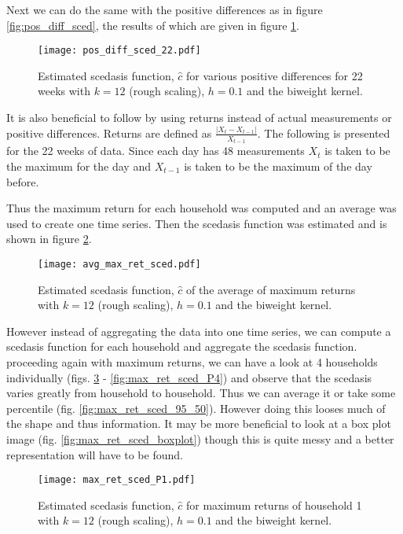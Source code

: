 \documentclass[a4paper]{article}
\begin{document}
Next we can do the same with the positive differences as in figure \ref{fig:pos_diff_sced}, the results of which are given in figure \ref{fig:pos_diff_sced_22}.

\begin{figure}
\centering
\texttt{[image: pos\_diff\_sced\_22.pdf]}
\caption{\label{fig:pos_diff_sced_22} Estimated scedasis function, $\hat{c}$ for various positive differences for 22 weeks with $k=12$ (rough scaling), $h=0.1$ and the biweight kernel.}
\end{figure}

It is also beneficial to follow \cite{einmahl16} by using returns instead of actual measurements or positive differences. Returns are defined as $\frac{\left|X_t - X_{t-1}\right|}{X_{t-1}}$.  The following is presented for the 22 weeks of data. Since each day has 48 measurements $X_t$ is taken to be the maximum for the day and $X_{t-1}$ is taken to be the maximum of the day before.

Thus the maximum return for each household was computed and an average was used to create one time series. Then the scedasis function was estimated and is shown in figure \ref{fig:avg_max_ret_sced}.

\begin{figure}
\centering
\texttt{[image: avg\_max\_ret\_sced.pdf]}
\caption{\label{fig:avg_max_ret_sced} Estimated scedasis function, $\hat{c}$ of the average of maximum returns with $k=12$ (rough scaling), $h=0.1$ and the biweight kernel.}
\end{figure}


However instead of aggregating the data into one time series, we can compute a scedasis function for each household and aggregate the scedasis function. proceeding again with maximum returns, we can have a look at 4 households individually (figs. \ref{fig:max_ret_sced_P1} - \ref{fig:max_ret_sced_P4}) and observe that the scedasis varies greatly from household to household. Thus we can average it or take some percentile (fig. \ref{fig:max_ret_sced_95_50}). However doing this looses much of the shape and thus information. It may be more beneficial to look at a box plot image (fig. \ref{fig:max_ret_sced_boxplot}) though this is quite messy and a better representation will have to be found.

\begin{figure}
\centering
\texttt{[image: max\_ret\_sced\_P1.pdf]}
\caption{\label{fig:max_ret_sced_P1} Estimated scedasis function, $\hat{c}$ for maximum returns of household 1 with $k=12$  (rough scaling), $h=0.1$ and the biweight kernel.}
\end{figure}
\end{document}
